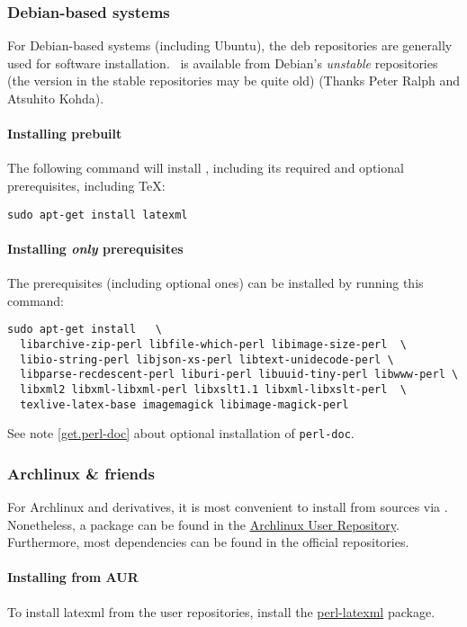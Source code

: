 \documentclass{article}
\begin{document}
\subsubsection{Debian-based systems}\label{get.linux.debian}
For Debian-based systems (including Ubuntu), the deb repositories
are generally used for software installation.
\LaTeXML\ is available from Debian's \emph{unstable} repositories
(the version in the stable repositories may be quite old)
(Thanks Peter Ralph and Atsuhito Kohda).

\paragraph*{Installing prebuilt}
The following command will install \LaTeXML, including its required
and optional prerequisites, including \TeX:
\begin{lstlisting}[style=shell]
sudo apt-get install latexml
\end{lstlisting}

\paragraph*{Installing \emph{only} prerequisites}\label{get.linux.debian.prereq}
The prerequisites (including optional ones) can be installed
by running this command: 
\begin{lstlisting}[style=shell]
sudo apt-get install   \
  libarchive-zip-perl libfile-which-perl libimage-size-perl  \
  libio-string-perl libjson-xs-perl libtext-unidecode-perl \
  libparse-recdescent-perl liburi-perl libuuid-tiny-perl libwww-perl \
  libxml2 libxml-libxml-perl libxslt1.1 libxml-libxslt-perl  \
  texlive-latex-base imagemagick libimage-magick-perl
\end{lstlisting}
See note \ref{get.perl-doc} about optional installation of \texttt{perl-doc}.

\subsubsection{Archlinux \& friends}\label{get.linux.arch}
For Archlinux and derivatives, it is most convenient to install from sources via . 
Nonetheless, a package can be found in the \href{https://aur.archlinux.org/}{Archlinux User Repository}.
Furthermore, most dependencies can be found in the official repositories.

\paragraph*{Installing from AUR}
To install latexml from the user repositories, install the \href{https://aur.archlinux.org/packages/perl-latexml/}{perl-latexml} package. 
\end{document}
